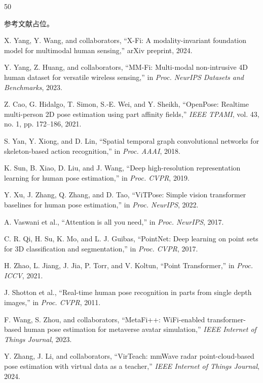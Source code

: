 \documentclass[journal]{IEEEtran}
\begin{document}
\begin{thebibliography}{50}

参考文献占位。

X. Yang, Y. Wang, and collaborators, ``X-Fi: A modality-invariant foundation model for multimodal human sensing,'' arXiv preprint, 2024.

Y. Yang, Z. Huang, and collaborators, ``MM-Fi: Multi-modal non-intrusive 4D human dataset for versatile wireless sensing,'' in \emph{Proc. NeurIPS Datasets and Benchmarks}, 2023.

Z. Cao, G. Hidalgo, T. Simon, S.-E. Wei, and Y. Sheikh, ``OpenPose: Realtime multi-person 2D pose estimation using part affinity fields,'' \emph{IEEE TPAMI}, vol. 43, no. 1, pp. 172--186, 2021.

S. Yan, Y. Xiong, and D. Lin, ``Spatial temporal graph convolutional networks for skeleton-based action recognition,'' in \emph{Proc. AAAI}, 2018.

K. Sun, B. Xiao, D. Liu, and J. Wang, ``Deep high-resolution representation learning for human pose estimation,'' in \emph{Proc. CVPR}, 2019.

Y. Xu, J. Zhang, Q. Zhang, and D. Tao, ``ViTPose: Simple vision transformer baselines for human pose estimation,'' in \emph{Proc. NeurIPS}, 2022.

A. Vaswani et al., ``Attention is all you need,'' in \emph{Proc. NeurIPS}, 2017.

C. R. Qi, H. Su, K. Mo, and L. J. Guibas, ``PointNet: Deep learning on point sets for 3D classification and segmentation,'' in \emph{Proc. CVPR}, 2017.

H. Zhao, L. Jiang, J. Jia, P. Torr, and V. Koltun, ``Point Transformer,'' in \emph{Proc. ICCV}, 2021.

J. Shotton et al., ``Real-time human pose recognition in parts from single depth images,'' in \emph{Proc. CVPR}, 2011.

F. Wang, S. Zhou, and collaborators, ``MetaFi++: WiFi-enabled transformer-based human pose estimation for metaverse avatar simulation,'' \emph{IEEE Internet of Things Journal}, 2023.

Y. Zhang, J. Li, and collaborators, ``VirTeach: mmWave radar point-cloud-based pose estimation with virtual data as a teacher,'' \emph{IEEE Internet of Things Journal}, 2024.


\end{thebibliography}
\end{document}

